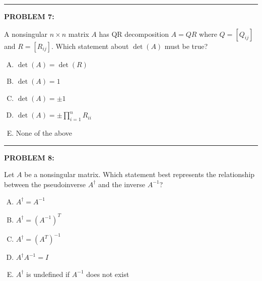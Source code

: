 \documentclass[12pt]{amsart}
\newcommand{\divider}{
  \vspace{-1em} %
  \noindent
  \raisebox{-0.15ex}{\textbullet}%
  \hspace{0.5em}%
  \rule[0.5ex]{0.95\textwidth}{1.0pt}%
  \hspace{0.5em}%
  \raisebox{-0.15ex}{\textbullet}%
  \vspace{0em} %
}
\begin{document}
\divider
\newpage

{\bf PROBLEM 7:}

A nonsingular $n \times n$ matrix $A$ has QR decomposition $A = QR$ where $Q=[Q_{ij}]$ and $R=[R_{ij}]$. 
Which statement about $\det(A)$ must be true?

\begin{enumerate}[(A)]
\item $\det(A) = \det(R)$
\item $\det(A) = 1$ 
\item $\det(A) = \pm 1$
\item $\det(A) = \pm \prod_{i=1}^n R_{ii}$
\item None of the above
\end{enumerate}


\divider

{\bf PROBLEM 8:}

Let $A$ be a nonsingular matrix. Which statement best represents the relationship between the pseudoinverse $A^{\dagger}$ and the inverse $A^{-1}$?

\begin{enumerate}[(A)]
\item $A^{\dagger} = A^{-1}$
\item $A^{\dagger} = (A^{-1})^T$
\item $A^{\dagger} = (A^T)^{-1}$
\item $A^{\dagger}A^{-1} = I$
\item $A^{\dagger}$ is undefined if $A^{-1}$ does not exist
\end{enumerate}
\end{document}

